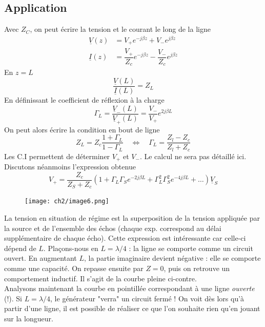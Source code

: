 	\subsection{Application}
	Avec $Z_C$, on peut écrire la tension et le courant le long de la ligne
	\begin{equation}
	\begin{split}
	\underline{V}(z) &= V_+e^{-j\beta z} + V_-e^{j\beta z}\\
	\underline{I}(z) &= \dfrac{V_+}{Z_c} e^{-j\beta z} - \dfrac{V_-}{Z_c}e^{j\beta z}	
	\end{split}
	\label{eq:2.45}
	\end{equation}
	En $z=L$
	\begin{equation}
	\dfrac{\underline{V}(L)}{\underline{I}(L)} = Z_L
	\end{equation}
	En définissant le coefficient de réflexion à la charge
	\begin{equation}
	\Gamma_L = \dfrac{\underline{V}_-(L)}{\underline{V}_+(L)} = \dfrac{V_-}{V_+}e^{2j\beta L}
	\label{eq:2.47}
	\end{equation}
	On peut alors écrire la condition en bout de ligne
	\begin{equation}
	Z_L = Z_c\dfrac{1+\Gamma_L}{1-\Gamma_L}\quad\Leftrightarrow\quad \Gamma_L = \dfrac{Z_l-Z_c}{
	Z_l+Z_c}
	\end{equation}
	Les C.I permettent de déterminer $V_+$ et $V_-$. Le calcul ne sera pas détaillé ici. Discutons 
	néanmoins l'expression obtenue
	\begin{equation}
	V_+ = \dfrac{Z_c}{Z_S+Z_c}\left(1+\Gamma_L\Gamma_Se^{-2j\beta L}+\Gamma_L^2\Gamma_S^2e^{-4j\beta L}
	+\dots\right)\underline{V}_S
	\end{equation}
	\begin{figure}
	\vspace{-5mm}
	\texttt{[image: ch2/image6.png]}
	\end{figure}
	La tension en situation de régime est la superposition de la tension appliquée par la source et de 
	l'ensemble des échos (chaque exp. correspond au délai supplémentaire de chaque écho). Cette 
	expression est intéressante car celle-ci dépend de $L$. Plaçons-nous en $L=\lambda/4$ : la ligne 
	se comporte comme un circuit ouvert. En augmentant $L$, la partie imaginaire devient négative : 
	elle se comporte comme une capacité. On repasse ensuite par $Z=0$, puis on retrouve un comportement 
	inductif. Il s'agit de la courbe pleine ci-contre.\\
	Analysons maintenant la courbe en pointillée correspondant à une ligne \textit{ouverte} (\!!). Si 
	$L=\lambda/4$, le générateur "verra" un circuit fermé ! On voit dès lors qu'à partir d'une ligne, 
	il est possible de réaliser ce que l'on souhaite rien qu'en jouant sur la longueur.
	
